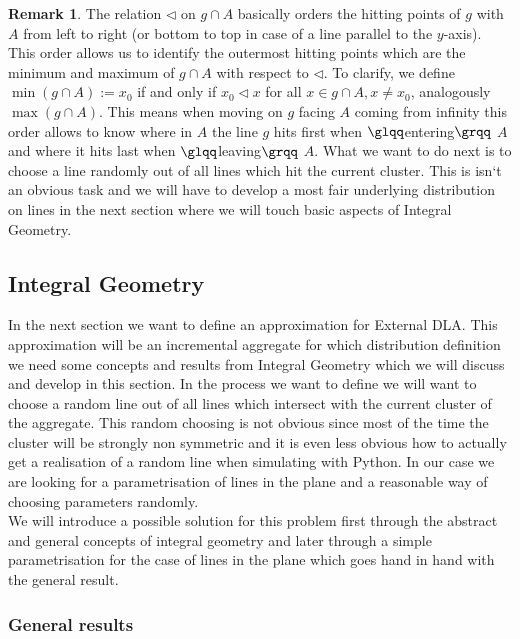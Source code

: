 \documentclass[12pt,a4paper]{scrartcl}
\numberwithin{equation}{subsection}
\newcommand{\1}{\mathbbm{1}}
\numberwithin{equation}{section}
\theoremstyle{definition}
\newtheorem{remark}{Remark}[subsection]
\begin{document}
\begin{remark}
	The relation $\triangleleft$ on $g\cap A$ basically orders the hitting points of $g$ with $A$ from left to right (or bottom to top in case of a line parallel to the $y$-axis). This order allows us to identify the outermost hitting points which are the minimum and maximum of $g\cap A$ with respect to $\triangleleft$. To clarify, we define $\min (g\cap A) := x_0$ if and only if $x_0 \triangleleft x$ for all $x\in g\cap A,x\neq x_0$, analogously $\max(g\cap A)$. This means when moving on $g$ facing $A$ coming from infinity this order allows to know where in $A$ the line $g$ hits first when $\glqq$entering$\grqq$ $A$ and where it hits last when $\glqq$leaving$\grqq$ $A$. What we want to do next is to choose a line randomly out of all lines which hit the current cluster. This is isn`t an obvious task and we will have to develop a most fair underlying distribution on lines in the next section where we will touch basic aspects of Integral Geometry. 
\end{remark}






\subsection{Integral Geometry}

In the next section we want to define an approximation for External DLA. This approximation will be an incremental aggregate for which distribution definition we need some concepts and results from Integral Geometry which we will discuss and develop in this section. In the process we want to define we will want to choose a random line out of all lines which intersect with the current cluster of the aggregate. This random choosing is not obvious since most of the time the cluster will be strongly non symmetric and it is even less obvious how to actually get a realisation of a random line when simulating with Python. In our case we are looking for a parametrisation of lines in the plane and a reasonable way of choosing parameters randomly. \\

We will introduce a possible solution for this problem first through the abstract and general concepts of integral geometry and later through a simple parametrisation for the case of lines in the plane which goes hand in hand with the general result.

\subsubsection{General results}
\end{document}
